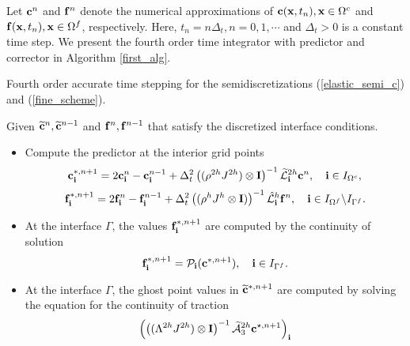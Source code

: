 Let ${\bf c}^{n}$ and ${\bf f}^{n}$ denote the numerical approximations of ${\bf c}({\bf x},t_n), {\bf x}\in\Omega^c$ and ${\bf f}({\bf x},t_n), {\bf x}\in\Omega^f$, respectively. Here, $t_n = n\Delta_t, n = 0,1,\cdots$ and $\Delta_t > 0$ is a constant time step. We present the fourth order time integrator with predictor and corrector in  Algorithm \ref{first_alg}.
~\\
\begin{breakablealgorithm}
	\caption{Fourth order accurate time stepping for the semidiscretizations  (\ref{elastic_semi_c}) and  (\ref{fine_scheme}). }\label{first_alg}
	Given  $\widetilde{{\bf c}}^{n}, \widetilde{{\bf c}}^{n-1}$ and ${\bf f}^{n}, {\bf f}^{n-1}$ that satisfy the discretized interface conditions.
	
	\begin{itemize}
		\item  {Compute the predictor at the interior grid points %
			\[{\bf c}^{*,n+1}_{\bf i} = 2{\bf c}^{n}_{\bf i} - {\bf c}^{n-1}_{\bf i} + \Delta_t^2\left((\rho^{2h}J^{2h})\otimes{\bf I}\right)^{-1}{\widetilde{\mathcal{L}}}^{2h}_{\bf i} {\bf{c}}^{n},\quad {\bf i}\in I_{\Omega^c},\]
			\[{\bf f}^{*,n+1}_{\bf i} = 2{\bf f}^{n}_{\bf i} - {\bf f}^{n-1}_{\bf i} + \Delta_t^2\left((\rho^{h}J^{h}\otimes{\bf I})\right)^{-1}\hat{\mathcal{L}}^{h}_{\bf i} {\bf{f}}^{n},\quad {\bf i}\in I_{\Omega^f}\backslash I_{\Gamma^f}.\]
		}
		\item{At the interface $\Gamma$, the values ${\bf f}^{*,n+1}_{\bf i}$  are computed by the continuity of solution 
			\begin{equation*}
			{\bf f}^{*,n+1}_{\bf i} = {\mathcal{P}}_{\bf i}({\bf c}^{*,n+1}),\quad {\bf i}\in I_{\Gamma^f}.
			\end{equation*}
		}
		\item{At the interface $\Gamma$, the ghost point values in $\widetilde{\bf c}^{*,n+1}$ are computed by solving the equation for the continuity of traction 
				\begin{equation}\label{traction_gamma_pre}
			\left(\left((\Lambda^{2h}J^{2h})\otimes{\bf I}\right)^{-1}\wt{\mathcal{A}}_3^{2h}{\bf c}^{\star,n+1}\right)_{\bf i}

\end{equation}}
\end{itemize}
\end{breakablealgorithm}
